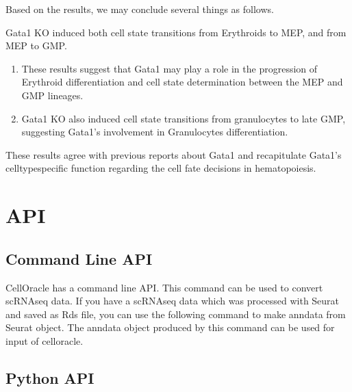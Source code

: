 \documentclass[letterpaper,10pt,english]{sphinxmanual}
\begin{document}
Based on the results, we may conclude several things as follows.

Gata1 KO induced both cell state transitions from Erythroids to MEP, and from MEP to GMP.
\begin{enumerate}
%
\item {} 
These results suggest that Gata1 may play a role in the progression of Erythroid differentiation and cell state determination between the MEP and GMP lineages.

\item {} 
Gata1 KO also induced cell state transitions from granulocytes to late GMP, suggesting Gata1’s involvement in Granulocytes differentiation.

\end{enumerate}

These results agree with previous reports about Gata1 and recapitulate Gata1’s cell\sphinxhyphen{}type\sphinxhyphen{}specific function regarding the cell fate decisions in hematopoiesis.


\section{API}
\label{\detokenize{modules/index:api}}\label{\detokenize{modules/index::doc}}

\subsection{Command Line API}
\label{\detokenize{modules/index:command-line-api}}
CellOracle has a command line API.
This command can be used to convert scRNA\sphinxhyphen{}seq data.
If you have a scRNA\sphinxhyphen{}seq data which was processed with Seurat and saved as Rds file, you can use the following command to make anndata from Seurat object.
The anndata object produced by this command can be used for input of celloracle.

\begin{sphinxVerbatim}[commandchars=\\\{\}]
  
\end{sphinxVerbatim}


\subsection{Python API}
\label{\detokenize{modules/index:python-api}}
\end{document}
